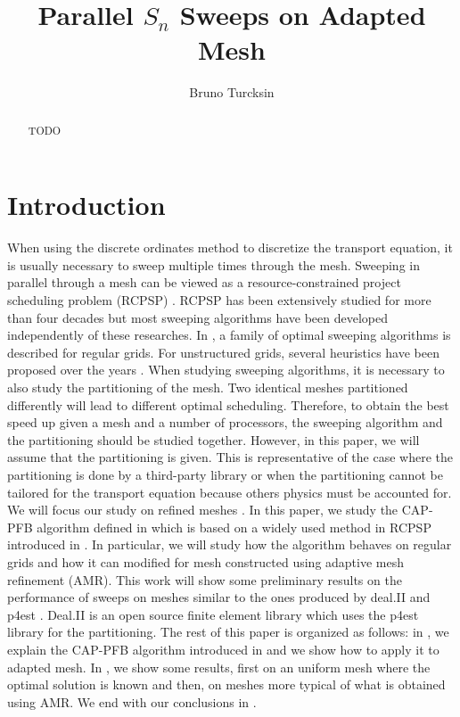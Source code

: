 \documentclass[letterpaper]{article}
\renewcommand{\(}{\left(}
\renewcommand{\)}{\right)}
\renewcommand{\[}{\left[}
\renewcommand{\]}{\right]}
\begin{document}
\title{Parallel $S_n$ Sweeps on Adapted Mesh}
\author{Bruno Turcksin} 
\date{}
\maketitle

\begin{abstract}
  TODO
\end{abstract}

\section{Introduction}
When using the discrete ordinates method to discretize the transport equation,
it is usually necessary to sweep multiple times through the mesh. Sweeping in
parallel through a mesh can be viewed as a resource-constrained project
scheduling problem (RCPSP) \cite{Brucker1999,Kolisch2006}. RCPSP has been
extensively studied for more than four decades \cite{Pritsker1969} but most
sweeping algorithms have been developed independently of these researches. In
\cite{Adams2013}, a family of optimal sweeping algorithms is described for
regular grids. For unstructured grids, several heuristics have been proposed
over the years \cite{Pautz2002,Plimpton2005,Yan2013,Colomer2013,Kumar2005}. When
studying sweeping algorithms, it is necessary to also study the partitioning of
the mesh. Two identical meshes partitioned differently will lead to different
optimal scheduling. Therefore, to obtain the best speed up given a mesh and a
number of processors, the sweeping algorithm and the partitioning should be
studied together. However, in this paper, we will assume that the partitioning
is given. This is representative of the case where the partitioning is done by a
third-party library or when the partitioning cannot be tailored for the
transport equation because others physics must be accounted for. We will focus
our study on refined meshes
\cite{Arnold2000,Baker2002,Bangerth2007,Jessee1998,Wang2010a}. In this paper, we
study the CAP-PFB algorithm defined in \cite{Mo2014} which is based on a widely
used method in RCPSP introduced in \cite{Li1992}. In particular, we will study
how the algorithm behaves on regular grids and how it can modified for mesh
constructed using adaptive mesh refinement (AMR). This work will show some
preliminary results on the performance of sweeps on meshes similar to the ones
produced by deal.II \cite{Bangerth2007,Bangerth2013} and p4est
\cite{Burstedde2011}. Deal.II is an open source finite element library which
uses the p4est library for the partitioning. The rest of this paper is organized
as follows: in , we explain the CAP-PFB algorithm
introduced in \cite{Mo2014} and we show how to apply it to adapted mesh. In
, we show some results, first on an uniform mesh where the optimal
solution is known and then, on meshes more typical of what is obtained using
AMR. We end with our conclusions in .
\end{document}
